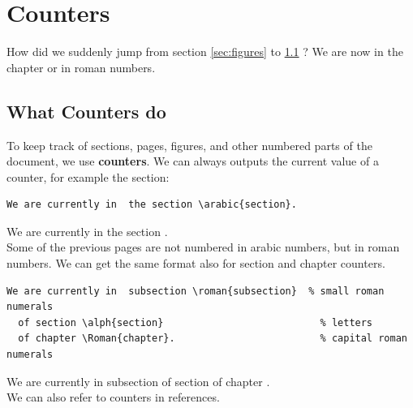 \documentclass[a4paper,10pt]{report} %
\begin{document}
 \setcounter{section}{1}
 \section{Counters}%
How did we suddenly jump from section \ref{sec:figures} to \ref{sec:counters}  ? We are now in the chapter  or  in roman numbers.\\

\subsection{What Counters do}\label{sec:counters}
To keep track of sections, pages, figures, and other numbered parts of the document, we use \textbf{counters}. We can always outputs the current value of a counter, for example the section:
\begin{lstlisting}[language={[latex]tex}, 
  frame=single,
  basicstyle=\footnotesize\color{darkgray}, 
  keywordstyle=\bf\color{magenta},
  commentstyle=\color{ForestGreen},  %
  breaklines=true
  ]
  We are currently in  the section \arabic{section}.
\end{lstlisting}

We are currently in  the section .\\

Some of the previous pages are not numbered in arabic numbers, but in roman numbers. We can get the same format also for section and chapter counters. 

\begin{lstlisting}[language={[latex]tex}, 
  frame=single,
  basicstyle=\footnotesize\color{darkgray}, 
  keywordstyle=\bf\color{magenta},
  commentstyle=\color{ForestGreen},  %
  breaklines=true
  ]
  We are currently in  subsection \roman{subsection}  % small roman numerals 
  of section \alph{section}                           % letters
  of chapter \Roman{chapter}.                         % capital roman numerals
\end{lstlisting}
 We are currently in  subsection   %
  of section                            %
  of chapter . \\                      %

  We can also refer to counters in references.
  
  

\addtocounter{subsection}{3}
\end{document}
